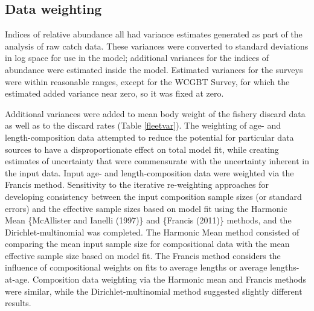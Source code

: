 \documentclass[11pt,
  english,
  a4paper,
]{article}
\begin{document}
\hypertarget{data-weighting}{%
\subsection{Data weighting}\label{data-weighting}}

\leavevmode\tagmcend\tagstructend


Indices of relative abundance all had variance estimates generated as part of the analysis of raw catch data. These variances were converted to standard deviations in log space for use in the model; additional variances for the indices of abundance were estimated inside the model. Estimated variances for the surveys were within reasonable ranges, except for the WCGBT Survey, for which the estimated added variance near zero, so it was fixed at zero.

\leavevmode\tagmcend\tagstructend\par


Additional variances were added to mean body weight of the fishery discard data as well as to the discard rates (Table \ref{fleetvar}). The weighting of age- and length-composition data attempted to reduce the potential for particular data sources to have a disproportionate effect on total model fit, while creating estimates of uncertainty that were commensurate with the uncertainty inherent in the input data. Input age- and length-composition data were weighted via the Francis method. Sensitivity to the iterative re-weighting approaches for developing consistency between the input composition sample sizes (or standard errors) and the effective sample sizes based on model fit using the Harmonic Mean \{{McAllister and Ianelli (1997)\leavevmode\tagmcend\tagstructend}\} and \{{Francis (2011)\leavevmode\tagmcend\tagstructend}\} methods, and the Dirichlet-multinomial was completed. The Harmonic Mean method consisted of comparing the mean input sample size for compositional data with the mean effective sample size based on model fit. The Francis method considers the influence of compositional weights on fits to average lengths or average lengths-at-age. Composition data weighting via the Harmonic mean and Francis methods were similar, while the Dirichlet-multinomial method suggested slightly different results.
\end{document}
